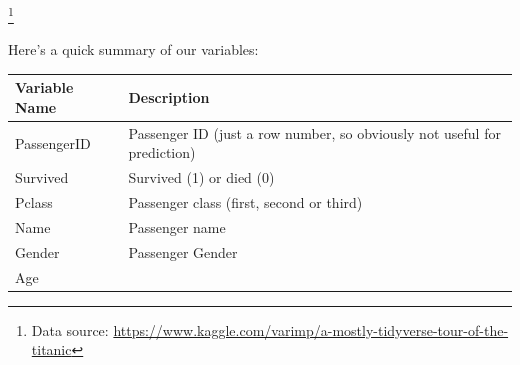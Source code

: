 \documentclass[]{book}
\begin{document}
\footnote{Data source: \url{https://www.kaggle.com/varimp/a-mostly-tidyverse-tour-of-the-titanic}}

Here's a quick summary of our variables:

\begin{longtable}[]{@{}ll@{}}
\toprule
\begin{minipage}[b]{0.49\columnwidth}\raggedright
Variable Name\strut
\end{minipage} & \begin{minipage}[b]{0.45\columnwidth}\raggedright
Description\strut
\end{minipage}\tabularnewline
\midrule
\endhead
\begin{minipage}[t]{0.49\columnwidth}\raggedright
PassengerID\strut
\end{minipage} & \begin{minipage}[t]{0.45\columnwidth}\raggedright
Passenger ID (just a row number, so obviously not useful for prediction)\strut
\end{minipage}\tabularnewline
\begin{minipage}[t]{0.49\columnwidth}\raggedright
Survived\strut
\end{minipage} & \begin{minipage}[t]{0.45\columnwidth}\raggedright
Survived (1) or died (0)\strut
\end{minipage}\tabularnewline
\begin{minipage}[t]{0.49\columnwidth}\raggedright
Pclass\strut
\end{minipage} & \begin{minipage}[t]{0.45\columnwidth}\raggedright
Passenger class (first, second or third)\strut
\end{minipage}\tabularnewline
\begin{minipage}[t]{0.49\columnwidth}\raggedright
Name\strut
\end{minipage} & \begin{minipage}[t]{0.45\columnwidth}\raggedright
Passenger name\strut
\end{minipage}\tabularnewline
\begin{minipage}[t]{0.49\columnwidth}\raggedright
Gender\strut
\end{minipage} & \begin{minipage}[t]{0.45\columnwidth}\raggedright
Passenger Gender\strut
\end{minipage}\tabularnewline
\begin{minipage}[t]{0.49\columnwidth}\raggedright
Age\strut
\end{minipage} & \begin{minipage}[t]{0.45\columnwidth}\raggedright

\end{minipage}
\end{longtable}
\end{document}
